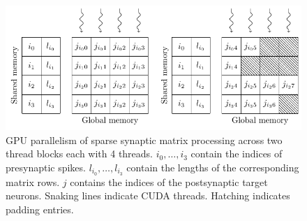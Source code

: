 \documentclass[utf8]{frontiersSCNS} %
\begin{document}
\begin{figure}
    \begin{center}
        \includegraphics{figures/ragged_matrix}
    \end{center}
    \caption{GPU parallelism of sparse synaptic matrix processing across two thread blocks each with \num{4} threads.
    $i_{0},\ldots,i_{3}$ contain the indices of presynaptic spikes.
    $l_{i_{0}},\ldots,l_{i_{3}}$ contain the lengths of the corresponding matrix rows.
    $j$ contains the indices of the postsynaptic target neurons.
    Snaking lines indicate CUDA threads.
    Hatching indicates padding entries.}
    \label{fig:ragged_matrix}
\end{figure}
\end{document}
